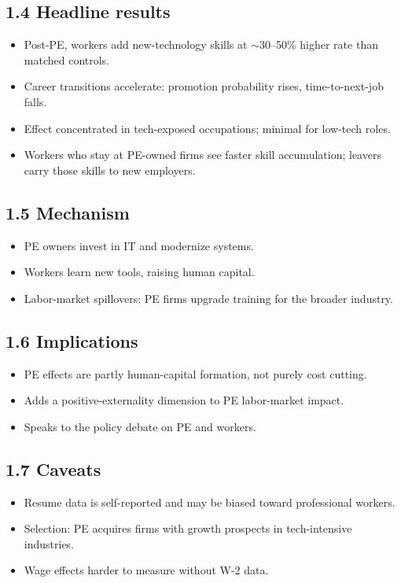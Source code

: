 \documentclass[11pt]{article}
\begin{document}
\subsection*{1.4 Headline results}
\begin{itemize}
\item Post-PE, workers add new-technology skills at $\sim$30--50\% higher rate than matched controls.
\item Career transitions accelerate: promotion probability rises, time-to-next-job falls.
\item Effect concentrated in tech-exposed occupations; minimal for low-tech roles.
\item Workers who stay at PE-owned firms see faster skill accumulation; leavers carry those skills to new employers.
\end{itemize}

\subsection*{1.5 Mechanism}
\begin{itemize}
\item PE owners invest in IT and modernize systems.
\item Workers learn new tools, raising human capital.
\item Labor-market spillovers: PE firms upgrade training for the broader industry.
\end{itemize}

\subsection*{1.6 Implications}
\begin{itemize}
\item PE effects are partly human-capital formation, not purely cost cutting.
\item Adds a positive-externality dimension to PE labor-market impact.
\item Speaks to the policy debate on PE and workers.
\end{itemize}

\subsection*{1.7 Caveats}
\begin{alertbox}
\begin{itemize}
\item Resume data is self-reported and may be biased toward professional workers.
\item Selection: PE acquires firms with growth prospects in tech-intensive industries.
\item Wage effects harder to measure without W-2 data.
\end{itemize}
\end{alertbox}
\end{document}
